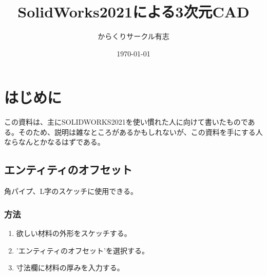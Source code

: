 \documentclass[a4paper,11pt]{jsarticle}
\title{SolidWorks2021による3次元CAD}
\author{からくりサークル有志}
\date{\today}
\begin{document}
\maketitle
\clearpage
\tableofcontents
\clearpage
\section{はじめに}
この資料は、主にSOLIDWORKS2021を使い慣れた人に向けて書いたものである。そのため、説明は雑なところがあるかもしれないが、この資料を手にする人ならなんとかなるはずである。
\subsection{エンティティのオフセット}
角パイプ、L字のスケッチに使用できる。
\subsubsection{方法}
 \begin{enumerate}
  \item 欲しい材料の外形をスケッチする。
  \item 'エンティティのオフセット'を選択する。
  \item 寸法欄に材料の厚みを入力する。
 \end{enumerate}
\end{document}
